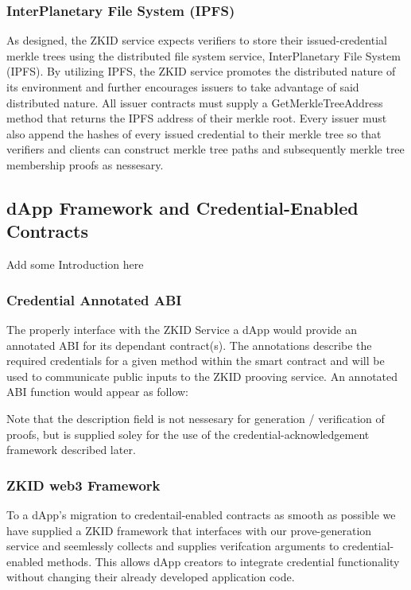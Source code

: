 \documentclass[11 pt]{extarticle}
\theoremstyle{remark}
\begin{document}
\subsubsection{InterPlanetary File System (IPFS)}

As designed, the ZKID service expects verifiers to store their issued-credential merkle trees using the distributed file system service, InterPlanetary File System (IPFS).
By utilizing IPFS, the ZKID service promotes the distributed nature of its environment and further encourages issuers to take advantage of said distributed nature. All issuer
contracts must supply a GetMerkleTreeAddress method that returns the IPFS address of their merkle root. Every issuer must also append the hashes of every issued credential 
to their merkle tree so that verifiers and clients can construct merkle tree paths and subsequently merkle tree membership proofs as nessesary. 

\subsection{dApp Framework and Credential-Enabled Contracts}

Add some Introduction here

\subsubsection{Credential Annotated ABI}
The properly interface with the ZKID Service a dApp would provide an annotated ABI for its dependant contract(s).
The annotations describe the required credentials for a given method within the smart contract and will
be used to communicate public inputs to the ZKID prooving service. An annotated ABI function
would appear as follow:

Note that the description field is not nessesary for generation / verification of proofs, but is supplied soley for
the use of the credential-acknowledgement framework described later. 

\subsubsection{ZKID web3 Framework}

To a dApp's migration to credentail-enabled contracts as smooth as possible we have supplied a ZKID framework that interfaces
with our prove-generation service and seemlessly collects and supplies verifcation arguments to credential-enabled methods. This 
allows dApp creators to integrate credential functionality without changing their already developed application code.
\end{document}

